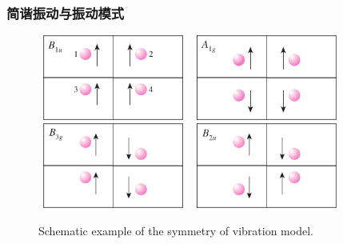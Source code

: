 \frame
{
	\frametitle{简谐振动与振动模式}
\begin{figure}[h!]
\centering
\vspace*{-0.05in}
\includegraphics[height=1.1in,width=1.95in,viewport=0 0 520 310,clip]{Figures/Viberation_of_B1u.png}
\includegraphics[height=1.1in,width=1.95in,viewport=0 0 515 310,clip]{Figures/Viberation_of_A1g.png}
\vskip 4pt
\includegraphics[height=1.1in,width=1.95in,viewport=0 0 520 310,clip]{Figures/Viberation_of_B3g.png}
\includegraphics[height=1.1in,width=1.95in,viewport=0 0 515 310,clip]{Figures/Viberation_of_B2u.png}
\caption{\tiny \textrm{Schematic example of the symmetry of vibration model.}}%
\label{virbration_model-symmetry}
\end{figure} 
}

